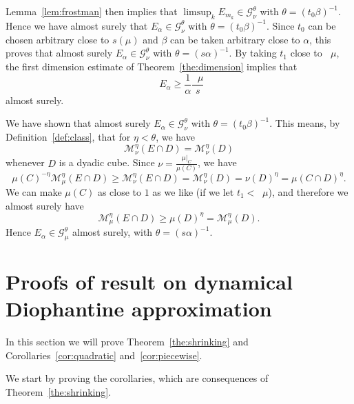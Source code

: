 \documentclass[11pt]{article}
\theoremstyle{definition}
\numberwithin{equation}{section}
\numberwithin{figure}{section}
\numberwithin{table}{section}
\DeclareMathOperator{\dimh}{dim_H}
\DeclareMathOperator{\ldimh}{\underline{dim}_H}
\DeclareMathOperator{\udimh}{\overline{dim}_H}
\begin{document}
Lemma~\ref{lem:frostman} then implies that $\limsup_k E_{m_k} \in
\mathscr{G}_\nu^\theta$ with $\theta = (t_0 \beta)^{-1}$. Hence we have almost surely that $E_\alpha \in \mathscr{G}_\nu^\theta$ with $\theta = (t_0 \beta)^{-1}$. Since $t_0$ can be chosen arbitrary close to $s (\mu)$ and $\beta$ can be taken arbitrary close to $\alpha$, this proves that almost surely $E_\alpha \in
\mathscr{G}_\nu^\theta$ with $\theta = (s \alpha)^{-1}$. By taking $t_1$ close to $\udimh \mu$, the first dimension estimate of Theorem~\ref{the:dimension} implies that
\[
\dimh E_\alpha \geq \frac{1}{\alpha} \frac{\udimh \mu}{s}
\]
almost surely.

We have shown that almost surely $E_\alpha \in \mathscr{G}_\nu^\theta$ with $\theta = (t_0 \beta)^{-1}$. This means, by Definition~\ref{def:class}, that for $\eta < \theta$, we have
\[
\mathscr{M}_\nu^\eta (E \cap D) = \mathscr{M}_\nu^\eta (D)
\]
whenever $D$ is a dyadic cube. Since $\nu = \frac{\mu|_C}{\mu(C)}$, we have
\[
\mu (C)^{-\eta} \mathscr{M}_\mu^\eta (E \cap D) \geq \mathscr{M}_\nu^\eta (E \cap D) = \mathscr{M}_\nu^\eta (D) = \nu (D)^\eta = \mu(C \cap D)^\eta.
\]
We can make $\mu(C)$ as close to $1$ as we like (if we let $t_1 <
\ldimh \mu$), and therefore we almost surely have
\[
\mathscr{M}_\mu^\eta (E \cap D) \geq \mu(D)^\eta =
\mathscr{M}_\mu^\eta (D).
\]
Hence $E_\alpha \in \mathscr{G}_\mu^\theta$ almost surely, with $\theta = (s \alpha)^{-1}$.



\section{Proofs of result on dynamical Diophantine approximation} \label{sec:shrinkingproofs}

In this section we will prove Theorem~\ref{the:shrinking} and Corollaries~\ref{cor:quadratic} and~\ref{cor:piecewise}.

We start by proving the corollaries, which are consequences of Theorem~\ref{the:shrinking}.
\end{document}
